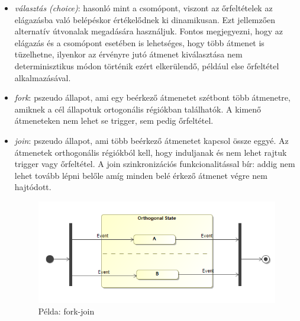 \begin{itemize}
	\item \emph{választás (choice)}: hasonló mint a csomópont, viszont az őrfeltételek az elágazásba való belépéskor értékelődnek ki dinamikusan. Ezt jellemzően alternatív útvonalak megadására használjuk. Fontos megjegyezni, hogy az elágazás és a csomópont esetében is lehetséges, hogy több átmenet is tüzelhetne, ilyenkor az érvényre jutó átmenet kiválasztása nem determinisztikus módon történik ezért elkerülendő, például else őrfeltétel alkalmazásával.
	\item \emph{fork}: pszeudo állapot, ami egy beérkező átmenetet szétbont több átmenetre, amiknek a cél állapotuk ortogonális régiókban találhatók. A kimenő átmeneteken nem lehet se trigger, sem pedig őrfeltétel.
	\item \emph{join}: pszeudo állapot, ami több beérkező átmenetet kapcsol össze eggyé. Az átmenetek orthogonális régiókból kell, hogy induljanak és nem lehet rajtuk trigger vagy őrfeltétel. A join szinkronizációs funkcionalitással bír: addig nem lehet tovább lépni belőle amíg minden belé érkező átmenet végre nem hajtódott.
	\begin{figure}[!ht]
		\centering
		\includegraphics[keepaspectratio]{figures/statechart_elements/forkjoin.png}
		\caption{Példa: fork-join}
	\end{figure}
	
\end{itemize}


